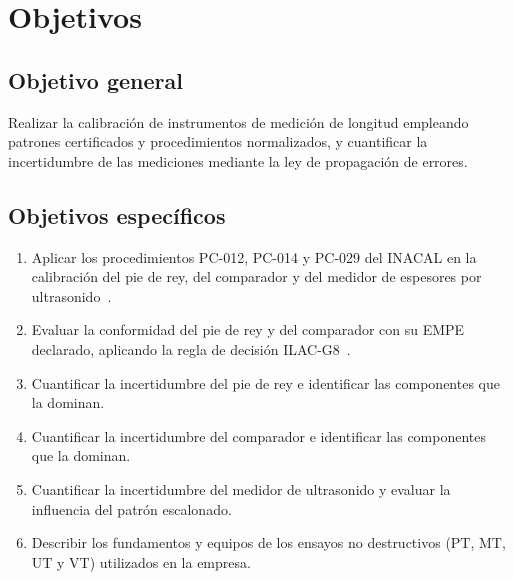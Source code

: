 \section{Objetivos}

\subsection{Objetivo general}

Realizar la calibración de instrumentos de medición de longitud empleando patrones
certificados y procedimientos normalizados, y cuantificar la incertidumbre de las
mediciones mediante la ley de propagación de errores.

\subsection{Objetivos específicos}

\begin{enumerate}
  \item Aplicar los procedimientos PC-012, PC-014 y PC-029 del INACAL en la
        calibración del pie de rey, del comparador y del medidor de espesores por
        ultrasonido~\parencite{inacal_pc012, inacal_pc014, inacal_pc029}.
  \item Evaluar la conformidad del pie de rey y del comparador con su EMPE
        declarado, aplicando la regla de decisión
        ILAC-G8~\parencite{ilac2019decision}.
  \item Cuantificar la incertidumbre del pie de rey e identificar las componentes
        que la dominan.
  \item Cuantificar la incertidumbre del comparador e identificar las componentes
        que la dominan.
  \item Cuantificar la incertidumbre del medidor de ultrasonido y evaluar la
        influencia del patrón escalonado.
  \item Describir los fundamentos y equipos de los ensayos no destructivos
        (PT, MT, UT y VT) utilizados en la empresa.
\end{enumerate}
